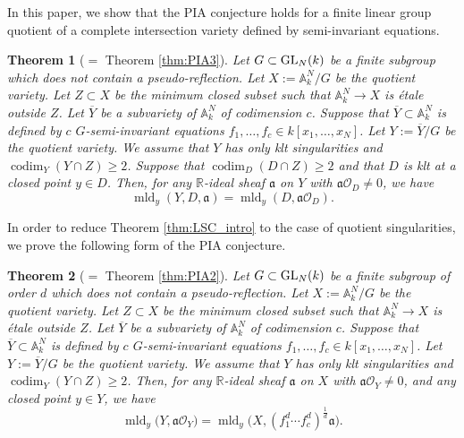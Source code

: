 \documentclass[a4paper,11pt]{amsart}
\newtheorem{thm}{Theorem}[section]
\theoremstyle{definition}
\theoremstyle{remark}
\begin{document}
In this paper, we show that the PIA conjecture holds for a finite linear group quotient of a complete intersection variety defined by semi-invariant equations.

\begin{thm}[{$=$ Theorem \ref{thm:PIA3}}]\label{thm:PIA_intro}
Let $G \subset {\rm GL}_N(k)$ be a finite subgroup which does not contain a pseudo-reflection. 
Let $X := \mathbb{A}_k^N / G$ be the quotient variety. 
Let $Z \subset X$ be the minimum closed subset such that $\mathbb{A}_k^N \to X$ is \'{e}tale outside $Z$. 
Let $\overline{Y}$ be a subvariety of $\mathbb{A}_k^N$ of codimension $c$. 
Suppose that $\overline{Y} \subset \mathbb{A}_k^N$ is defined by $c$ $G$-semi-invariant equations 
$f_1, \ldots , f_c \in k[x_1, \ldots, x_N]$. 
Let $Y := \overline{Y}/ G$ be the quotient variety. 
We assume that $Y$ has only klt singularities and $\operatorname{codim} _Y (Y \cap Z) \ge 2$. 
Suppose that $\operatorname{codim}_D (D \cap Z) \ge 2$ and that $D$ is klt at a closed point $y \in D$. 
Then, for any $\mathbb{R}$-ideal sheaf $\mathfrak{a}$ on $Y$ with $\mathfrak{a} \mathcal{O}_D \not = 0$, we have 
\[
\operatorname{mld}_y \left( Y,D, \mathfrak{a} \right) = 
\operatorname{mld}_y \left( D, \mathfrak{a} \mathcal{O}_D \right). 
\]
\end{thm}

In order to reduce Theorem \ref{thm:LSC_intro} to the case of quotient singularities, we prove the following form of the PIA conjecture.

\begin{thm}[{$=$ Theorem \ref{thm:PIA2}}]\label{thm:PIA2_intro}
Let $G \subset {\rm GL}_N(k)$ be a finite subgroup of order $d$  which does not contain a pseudo-reflection. 
Let $X := \mathbb{A}_k^N / G$ be the quotient variety. 
Let $Z \subset X$ be the minimum closed subset such that $\mathbb{A}_k^N \to X$ is \'{e}tale outside $Z$. 
Let $\overline{Y}$ be a subvariety of $\mathbb{A}_k^N$ of codimension $c$. 
Suppose that $\overline{Y} \subset \mathbb{A}_k^N$ is defined by $c$ $G$-semi-invariant equations 
$f_1, \ldots , f_c \in k[x_1, \ldots, x_N]$. 
Let $Y := \overline{Y}/ G$ be the quotient variety. 
We assume that $Y$ has only klt singularities and $\operatorname{codim} _Y (Y \cap Z) \ge 2$. 
Then, for any $\mathbb{R}$-ideal sheaf $\mathfrak{a}$ on $X$ 
with $\mathfrak{a} \mathcal{O}_Y \not = 0$, and any closed point $y \in Y$, we have 
\[
\operatorname{mld}_y \bigl( Y, \mathfrak{a}\mathcal{O}_Y \bigr) = 
\operatorname{mld}_y \bigl( X, (f_1 ^d  \cdots f_{c} ^d )^{\frac{1}{d}} \mathfrak{a} \bigr). 
\]
\end{thm}
\end{document}
